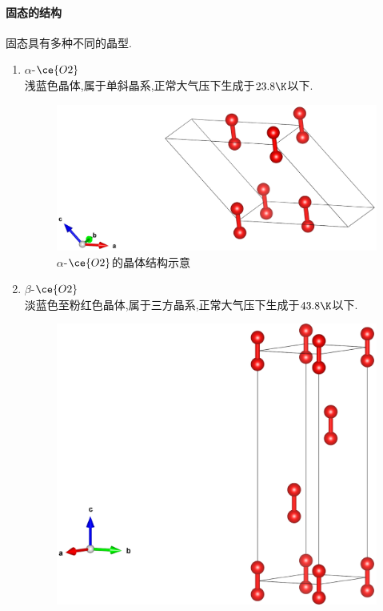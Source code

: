 \documentclass{ctexart}
\begin{document}
\paragraph{固态的结构}
固态具有多种不同的晶型.
\begin{enumerate}[label=\tbf{\arabic*},topsep=0pt,parsep=0pt,itemsep=0pt,partopsep=0pt]
    \item $\alpha$-$\ce{O2}$\\
        \indent 浅蓝色晶体,属于单斜晶系,正常大气压下生成于$23.8\K$以下.
        \begin{figure}[H]
            \centering\includegraphics[scale=0.125]{picture/alpha-O2.eps}
            \caption{$\alpha$-$\ce{O2}$的晶体结构示意}
        \end{figure}
    \item $\beta$-$\ce{O2}$\\
        \indent 淡蓝色至粉红色晶体,属于三方晶系,正常大气压下生成于$43.8\K$以下.
        \begin{figure}[H]
            \centering\includegraphics[scale=0.125]{picture/beta-O2.eps}

\end{figure}
\end{enumerate}
\end{document}
